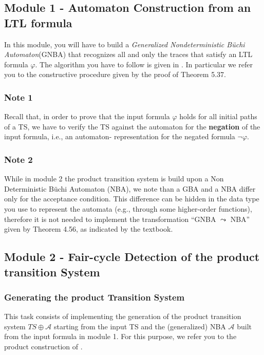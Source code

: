 \documentclass{article}
\begin{document}
\subsection{Module 1 - Automaton Construction from an LTL formula}
\label{subsec-m1}
In this module, you will have to build a \emph{Generalized Nondeterministic Büchi Automaton}(GNBA) 
that recognizes all and only the traces that satisfy an LTL formula $\varphi$. The algorithm you have to follow 
is given in \cite[Section 5.2]{BaKa}. 
In particular we refer you to the constructive procedure given by the proof of Theorem 5.37.


\subsubsection*{Note 1}
Recall that, in order to prove that the input formula $\varphi$ holds for all initial paths of a TS, we have 
to verify the TS against the automaton for the \textbf{negation} of the input formula, i.e., an automaton-
representation for the negated formula $\neg \varphi$.

\subsubsection*{Note 2}
While in module 2 the product transition system is build upon a Non Deterministic Büchi Automaton (NBA), we note 
than a GBA and a NBA differ only for the acceptance condition. This difference can be hidden in the 
data type you use to represent the automata (e.g., through some higher-order functions), 
therefore it is not needed to implement the transformation ``GNBA $\leadsto$ NBA'' given by Theorem 4.56, as indicated 
by the textbook.

\subsection{Module 2 - Fair-cycle Detection of the product transition System}
\label{subsec-m2}
\subsubsection*{Generating the product Transition System}
This task consists of implementing the generation of the product transition system $TS \oplus \mathcal{A}$
starting from the input TS and the (generalized) NBA $\mathcal{A}$ built from the input formula in module 1.
For this purpose, we refer you to the product construction of \cite[Section 4.4.1]{BaKa}.
\end{document}
